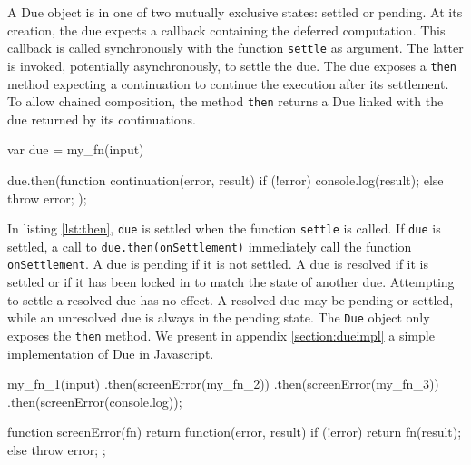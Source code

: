 A Due object is in one of two mutually exclusive states: settled or pending.
At its creation, the due expects a callback containing the deferred computation.
This callback is called synchronously with the function \texttt{settle} as argument.
The latter is invoked, potentially asynchronously, to settle the due.
The due exposes a \texttt{then} method expecting a continuation to continue the execution after its settlement.
To allow chained composition, the method \texttt{then} returns a Due linked with the due returned by its continuations.

\begin{code}[js, %
             caption={Example of a due}, %
             label={lst:then}] %
var due = my_fn(input)

due.then(function continuation(error, result) {
  if (!error) {
    console.log(result);
  } else {
    throw error;
  }
});
\end{code}

In listing \ref{lst:then}, \texttt{due} is settled when the function \texttt{settle} is called.
If \texttt{due} is settled, a call to \texttt{due.then(onSettlement)} immediately call the function \texttt{onSettlement}.
A due is pending if it is not settled.
A due is resolved if it is settled or if it has been locked in to match the state of another due.
Attempting to settle a resolved due has no effect.
A resolved due may be pending or settled, while an unresolved due is always in the pending state.
The \texttt{Due} object only exposes the \texttt{then} method.
We present in appendix \ref{section:dueimpl} a simple implementation of Due in Javascript.

\begin{code}[js, %
             caption={Dues are chained like Promises}, %
             label={lst:dues-sequence}] %
my_fn_1(input)
.then(screenError(my_fn_2))
.then(screenError(my_fn_3))
.then(screenError(console.log));

function screenError(fn) {
  return function(error, result) {
    if (!error) {
      return fn(result);
    } else {
      throw error;
    }
  };
}
\end{code}